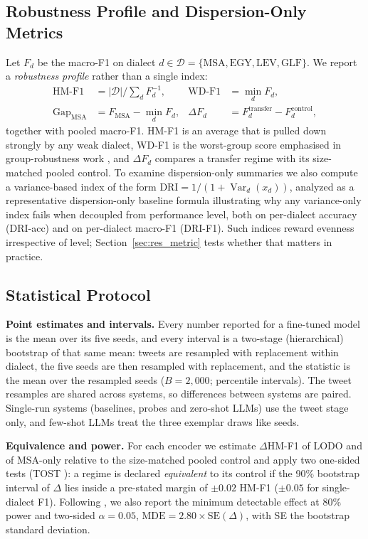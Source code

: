 \documentclass[11pt]{article}
\begin{document}
\subsection{Robustness Profile and Dispersion-Only Metrics}
\label{sec:metrics}
Let $F_d$ be the macro-F1 on dialect $d \in \mathcal{D}=\{\text{MSA},\text{EGY},\text{LEV},\text{GLF}\}$. We report a \emph{robustness profile} rather than a single index:
\begin{align}
\text{HM-F1} &= |\mathcal{D}| \Big/ \textstyle\sum_{d} F_d^{-1}, &
\text{WD-F1} &= \min_{d} F_d, \nonumber\\
\text{Gap}_{\text{MSA}} &= F_{\text{MSA}} - \min_{d} F_d, &
\Delta F_d &= F_d^{\text{transfer}} - F_d^{\text{control}},
\end{align}
together with pooled macro-F1. HM-F1 is an average that is pulled down strongly by any weak dialect, WD-F1 is the worst-group score emphasised in group-robustness work \cite{sagawa2020groupdro}, and $\Delta F_d$ compares a transfer regime with its size-matched pooled control. To examine dispersion-only summaries we also compute a variance-based index of the form $\text{DRI}=1/(1+\operatorname{Var}_d(x_d))$, analyzed as a representative dispersion-only baseline formula illustrating why any variance-only index fails when decoupled from performance level, both on per-dialect accuracy (DRI-acc) and on per-dialect macro-F1 (DRI-F1). Such indices reward evenness irrespective of level; Section~\ref{sec:res_metric} tests whether that matters in practice.

\subsection{Statistical Protocol}
\label{sec:stats}
\textbf{Point estimates and intervals.} Every number reported for a fine-tuned model is the mean over its five seeds, and every interval is a two-stage (hierarchical) bootstrap of that same mean: tweets are resampled with replacement within dialect, the five seeds are then resampled with replacement, and the statistic is the mean over the resampled seeds ($B=2{,}000$; percentile intervals). The tweet resamples are shared across systems, so differences between systems are paired. Single-run systems (baselines, probes and zero-shot LLMs) use the tweet stage only, and few-shot LLMs treat the three exemplar draws like seeds.

\textbf{Equivalence and power.} For each encoder we estimate $\Delta$HM-F1 of LODO and of MSA-only relative to the size-matched pooled control and apply two one-sided tests (TOST \cite{lakens2017equivalence}): a regime is declared \emph{equivalent} to its control if the 90\% bootstrap interval of $\Delta$ lies inside a pre-stated margin of $\pm0.02$ HM-F1 ($\pm0.05$ for single-dialect F1). Following \cite{card2020power}, we also report the minimum detectable effect at 80\% power and two-sided $\alpha=0.05$, $\text{MDE}=2.80\times\text{SE}(\Delta)$, with SE the bootstrap standard deviation.
\end{document}
